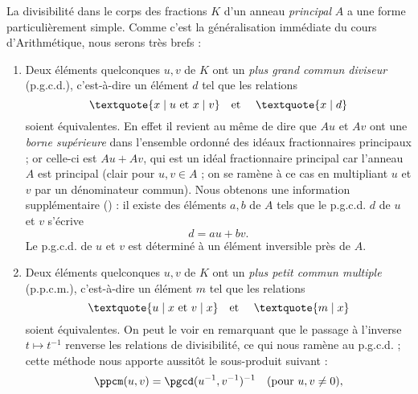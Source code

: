 \documentclass[11pt, useosf,
  title in boldface,
  theorem in new line,
  theorem numbering = section,
  number theorems separately,
]{simplivre}
\begin{document}
    La divisibilité dans le corps des fractions \( K \) d'un anneau \emph{principal} \( A \) a une forme particulièrement simple. Comme c'est la généralisation immédiate du cours d'Arithmétique, nous serons très brefs :
    \begin{enumerate}[itemsep=.3\baselineskip]
        \item \label{divisibilité dans le corps des fractions;pgcd} Deux éléments quelconques \( u,v \) de \( K \) ont un \emph{plus grand commun diviseur} (p.g.c.d.), c'est-à-dire un élément \( d \) tel que les relations
        \begin{equation}
            \text{\textquote{\( x \mid u \) et \( x \mid v \)}\quad et \quad \textquote{\( x \mid d \)}}
        \end{equation}
        soient équivalentes. En effet il revient au même de dire que \( Au \) et \( Av \) ont une \emph{borne supérieure} dans l'ensemble ordonné des idéaux fractionnaires principaux ; or celle-ci est \( Au+Av \), qui est un idéal fractionnaire principal car l'anneau \( A \) est principal (clair pour \( u,v \in A \) ; on se ramène à ce cas en multipliant \( u \) et \( v \) par un dénominateur commun). Nous obtenons une information supplémentaire () : il existe des éléments \( a,b \) de \( A \) tels que le p.g.c.d. \( d \) de \( u \) et \( v \) s'écrive
        \begin{equation}
            d = au+bv. \label{eq:bezout}
        \end{equation}
        Le p.g.c.d. de \( u \) et \( v \) est déterminé à un élément inversible près de \( A \).
        \item Deux éléments quelconques \( u,v \) de \( K \) ont un \emph{plus petit commun multiple} (p.p.c.m.), c'est-à-dire un élément \( m \) tel que les relations
        \begin{equation}
            \text{\textquote{\( u \mid x \) et \( v \mid x \)}\quad et \quad \textquote{\( m \mid x \)}}
        \end{equation}
        soient équivalentes. On peut le voir en remarquant que le passage à l'inverse \( t \mapsto t^{-1} \) renverse les relations de divisibilité, ce qui nous ramène au p.g.c.d. ; cette méthode nous apporte aussitôt le sous-produit suivant :
        \begin{equation}
            \ppcm(u,v) = \pgcd(u^{-1},v^{-1})^{-1} \quad (\text{pour } u,v \neq 0),

\end{equation}
\end{enumerate}
\end{document}
